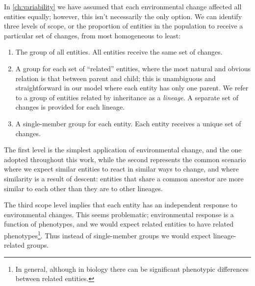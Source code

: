In \cref{ch:variability} we have assumed that each environmental change affected all entities equally; however, this isn't necessarily the only option. We can identify three levels of scope, or the proportion of entities in the population to receive a particular set of changes, from most homogeneous to least:

\begin{enumerate}
	\item The group of all entities. All entities receive the same set of changes.
	\item A group for each set of ``related'' entities, where the most natural and obvious relation is that between parent and child; this is unambiguous and straightforward in our model where each entity has only one parent. We refer to a group of entities related by inheritance as a \emph{lineage}. A separate set of changes is provided for each lineage.
	\item A single-member group for each entity. Each entity receives a unique set of changes.
\end{enumerate}

The first level is the simplest application of environmental change, and the one adopted throughout this work, while the second represents the common scenario where we expect similar entities to react in similar ways to change, and where similarity is a result of descent: entities that share a common ancestor are more similar to each other than they are to other lineages. 

The third scope level implies that each entity has an independent response to environmental changes. This seems problematic; environmental response is a function of phenotypes, and we would expect related entities to have related phenotypes\footnote{In general, although in biology there can be significant phenotypic differences between related entities.}. Thus instead of single-member groups we would expect lineage-related groups.

